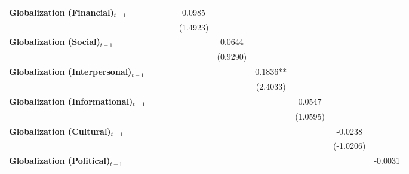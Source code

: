 \begin{center}
\begin{tabular}{lccccccccc}
\textbf{Globalization (Financial)$_{t-1}$}             &                &                  &                  &      0.0985      &                  &                  &                  &                  &                   \\
\textbf{ }                         &                &                  &                  &     (1.4923)     &                  &                  &                  &                  &                   \\
\textbf{Globalization (Social)$_{t-1}$}             &                &                  &                  &                  &      0.0644      &                  &                  &                  &                   \\
\textbf{ }                         &                &                  &                  &                  &     (0.9290)     &                  &                  &                  &                   \\
\textbf{Globalization (Interpersonal)$_{t-1}$}             &                &                  &                  &                  &                  &     0.1836**     &                  &                  &                   \\
\textbf{ }                         &                &                  &                  &                  &                  &     (2.4033)     &                  &                  &                   \\
\textbf{Globalization (Informational)$_{t-1}$}             &                &                  &                  &                  &                  &                  &      0.0547      &                  &                   \\
\textbf{ }                         &                &                  &                  &                  &                  &                  &     (1.0595)     &                  &                   \\
\textbf{Globalization (Cultural)$_{t-1}$}             &                &                  &                  &                  &                  &                  &                  &     -0.0238      &                   \\
\textbf{ }                         &                &                  &                  &                  &                  &                  &                  &    (-1.0206)     &                   \\
\textbf{Globalization (Political)$_{t-1}$}             &                &                  &                  &                  &                  &                  &                  &                  &     -0.0031       \\

\end{tabular}
\end{center}

